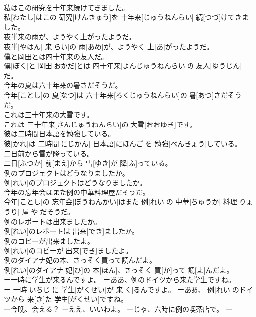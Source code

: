 \documentclass[8pt]{extreport}
\begin{document}
\begin{CJK}{UTF8}{min}
\\	私はこの研究を十年来続けてきました。	
\\	私[わたし]はこの 研究[けんきゅう]を 十年来[じゅうねんらい] 続[つづ]けてきました。
\\	夜半来の雨が、ようやく上がったようだ。	
\\	夜半[やはん] 来[らい]の 雨[あめ]が、ようやく 上[あ]がったようだ。
\\	僕と岡田とは四十年来の友人だ。	
\\	僕[ぼく]と 岡田[おかだ]とは 四十年来[よんじゅうねんらい]の 友人[ゆうじん]だ。
\\	今年の夏は六十年来の暑さだそうだ。	
\\	今年[ことし]の 夏[なつ]は 六十年来[ろくじゅうねんらい]の 暑[あつ]さだそうだ。
\\	これは三十年来の大雪です。	
\\	これは 三十年来[さんじゅうねんらい]の 大雪[おおゆき]です。
\\	彼は二時間日本語を勉強している。	
\\	彼[かれ]は 二時間[にじかん] 日本語[にほんご]を 勉強[べんきょう]している。
\\	二日前から雪が降っている。	
\\	二日[ふつか] 前[まえ]から 雪[ゆき]が 降[ふ]っている。
\\	例のプロジェクトはどうなりましたか。	
\\	例[れい]のプロジェクトはどうなりましたか。
\\	今年の忘年会はまた例の中華料理屋だそうだ。	
\\	今年[ことし]の 忘年会[ぼうねんかい]はまた 例[れい]の 中華[ちゅうか] 料理[りょうり] 屋[や]だそうだ。
\\	例のレポートは出来ましたか。	
\\	例[れい]のレポートは 出来[でき]ましたか。
\\	例のコピーが出来ましたよ。	
\\	例[れい]のコピーが 出来[でき]ましたよ。
\\	例のダイアナ妃の本、さっそく買って読んだよ。	
\\	例[れい]のダイアナ 妃[ひ]の 本[ほん]、さっそく 買[か]って 読[よ]んだよ。
\\	ー一時に学生が来るんですよ。 ーああ、例のドイツから来た学生ですね。	
\\	ー 一時[いちじ]に 学生[がくせい]が 来[く]るんですよ。 ーああ、 例[れい]のドイツから 来[き]た 学生[がくせい]ですね。
\\	ー今晩、会える？ ーええ、いいわよ。 ーじゃ、六時に例の喫茶店で。	ー

\end{CJK}
\end{document}
